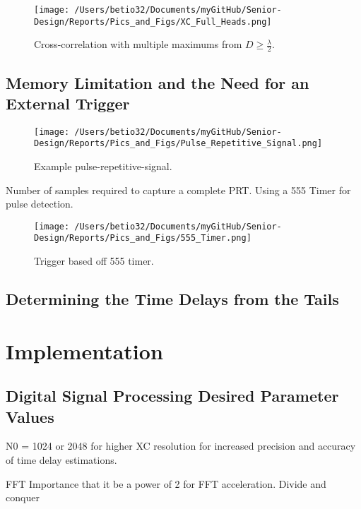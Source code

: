 \documentclass[12pt]{article}
\begin{document}
\pagebreak

\begin{figure}[!h]
	\centering
	\texttt{[image: /Users/betio32/Documents/myGitHub/Senior-Design/Reports/Pics\_and\_Figs/XC\_Full\_Heads.png]}
    \caption{Cross-correlation with multiple maximums from $D \geq \frac{\lambda}{2}$.} \label{fig:XC_Full_Heads}
\end{figure}

\subsection{Memory Limitation and the Need for an External Trigger}

\begin{figure}[!h]
	\centering
	\texttt{[image: /Users/betio32/Documents/myGitHub/Senior-Design/Reports/Pics\_and\_Figs/Pulse\_Repetitive\_Signal.png]}
    \caption{Example pulse-repetitive-signal.} \label{fig:Pulse_Repetitive_Signal}
\end{figure}

	Number of samples required to capture a complete PRT. 
    Using a 555 Timer for pulse detection.

\pagebreak

\begin{figure}[!h]
	\centering
	\texttt{[image: /Users/betio32/Documents/myGitHub/Senior-Design/Reports/Pics\_and\_Figs/555\_Timer.png]}
    \caption{Trigger based off 555 timer.} \label{fig:555_Timer}
\end{figure}

\subsection{Determining the Time Delays from the Tails}

\section{Implementation}

\subsection{Digital Signal Processing Desired Parameter Values}
	N0 = 1024 or 2048 for higher XC resolution for increased precision and accuracy of time delay estimations.
    
    FFT
    	Importance that it be a power of 2 for FFT acceleration.
    	Divide and conquer
\end{document}
